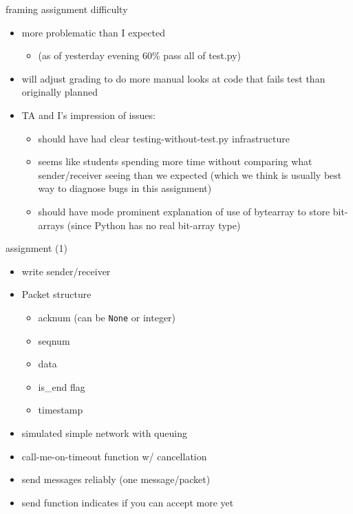 \begin{frame}{framing assignment difficulty}
    \begin{itemize}
    \item more problematic than I expected
        \begin{itemize}
        \item (as of yesterday evening 60\% pass all of test.py)
        \end{itemize}
    \item will adjust grading to do more manual looks at code that fails test than originally planned
    \vspace{.5cm}
    \item TA and I's impression of issues:
        \begin{itemize}
        \item should have had clear testing-without-test.py infrastructure
        \item seems like students spending more time without comparing what sender/receiver seeing than we expected (which we think is usually best way to diagnose bugs in this assignment)
        \item should have mode prominent explanation of use of bytearray to store bit-arrays (since Python has no real bit-array type)
        \end{itemize}
    \end{itemize}
\end{frame}


\begin{frame}{assignment (1)}
    \begin{itemize}
    \item write sender/receiver
    \item Packet structure
        \begin{itemize}
        \item acknum (can be \texttt{None} or integer)
        \item seqnum
        \item data
        \item is\_end flag
        \item timestamp
        \end{itemize}
    \item simulated simple network with queuing
    \item call-me-on-timeout function w/ cancellation
    \item send messages reliably (one message/packet)
    \item send function indicates if you can accept more yet
    \end{itemize}
\end{frame}

